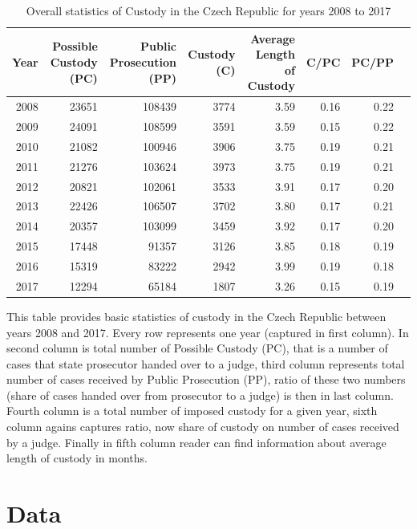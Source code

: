 \documentclass[12pt, twoside]{book} %
\begin{document}
\begin{table}
\centering
\begin{tabular}{rrrrrrrr}
  \hline
 Year & Possible Custody (PC) & Public Prosecution (PP) & Custody (C) & Average Length of Custody & C/PC & PC/PP \\ 
  \hline
 2008 & 23651 & 108439 & 3774 & 3.59 & 0.16 & 0.22 \\ 
   2009 & 24091 & 108599 & 3591 & 3.59 & 0.15 & 0.22 \\ 
   2010 & 21082 & 100946 & 3906 & 3.75 & 0.19 & 0.21 \\ 
   2011 & 21276 & 103624 & 3973 & 3.75 & 0.19 & 0.21 \\ 
  2012 & 20821 & 102061 & 3533 & 3.91 & 0.17 & 0.20 \\ 
   2013 & 22426 & 106507 & 3702 & 3.80 & 0.17 & 0.21 \\ 
   2014 & 20357 & 103099 & 3459 & 3.92 & 0.17 & 0.20 \\ 
   2015 & 17448 & 91357 & 3126 & 3.85 & 0.18 & 0.19 \\ 
  2016 & 15319 & 83222 & 2942 & 3.99 & 0.19 & 0.18 \\ 
   2017 & 12294 & 65184 & 1807 & 3.26 & 0.15 & 0.19 \\ 
   \hline
\end{tabular}
  \caption{Overall statistics of Custody in the Czech Republic for years 2008 to 2017 }

 \medskip
This table provides basic statistics of custody in the Czech Republic between years 2008 and 2017. Every row represents one year (captured in first column). In second column is total number of Possible Custody (PC), that is a number of cases that state prosecutor handed over to a judge, third column represents total number of cases received by Public Prosecution (PP), ratio of these two numbers (share of cases handed over from prosecutor to a judge) is then in last column. Fourth column is a total number of imposed custody for a given year, sixth column agains captures ratio, now share of custody on number of cases received by a judge. Finally in fifth column reader can find information about average length of custody in months.
\end{table}













\section{Data}     %
\end{document}
